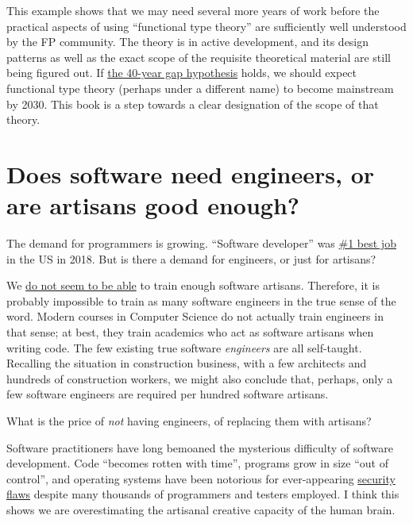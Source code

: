 This example shows that we may need several more years of work before
the practical aspects of using ``functional type theory'' are sufficiently
well understood by the FP community. The theory is in active development,
and its design patterns \textendash{} as well as the exact scope of
the requisite theoretical material \textendash{} are still being figured
out. If \href{https://www.linkedin.com/pulse/40-year-gap-what-has-academic-computer-science-ever-done-winitzki/}{the 40-year gap hypothesis}
holds, we should expect functional type theory (perhaps under a different
name) to become mainstream by 2030. This book is a step towards a
clear designation of the scope of that theory.

\section{Does software need engineers, or are artisans good enough? }

The demand for programmers is growing. ``Software developer'' was
\href{https://money.usnews.com/money/careers/articles/how-us-news-ranks-the-best-jobs}{\#1 best job}
in the US in 2018. But is there a demand for engineers, or just for
artisans?

We \href{https://www.mendix.com/blog/5-stats-illustrating-the-developer-shortage-facing-enterprise-organizations/}{do not seem to be able}
to train enough software artisans. Therefore, it is probably impossible
to train as many software engineers in the true sense of the word.
Modern courses in Computer Science do not actually train engineers
in that sense; at best, they train academics who act as software artisans
when writing code. The few existing true software \emph{engineers}
are all self-taught. Recalling the situation in construction business,
with a few architects and hundreds of construction workers, we might
also conclude that, perhaps, only a few software engineers are required
per hundred software artisans.

What is the price of \emph{not} having engineers, of replacing them
with artisans?

Software practitioners have long bemoaned the mysterious difficulty
of software development. Code ``becomes rotten with time'', programs
grow in size ``out of control'', and operating systems have been
notorious for ever-appearing \href{https://www.techrepublic.com/article/a-malicious-usb-stick-could-crash-your-windows-pc-even-if-its-locked/}{security flaws}
despite many thousands of programmers and testers employed. I think
this shows we are overestimating the artisanal creative capacity of
the human brain.

